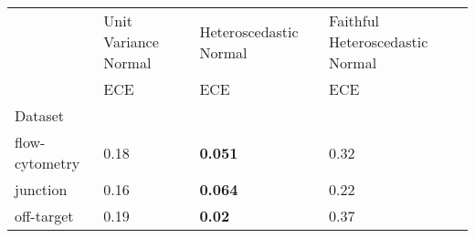 \begin{tabular}{l|l|l|l}
\toprule
 & Unit Variance Normal & Heteroscedastic Normal & Faithful Heteroscedastic Normal \\
 & ECE & ECE & ECE \\
Dataset &  &  &  \\
\midrule
flow-cytometry & 0.18 & \bfseries 0.051 & 0.32 \\
junction & 0.16 & \bfseries 0.064 & 0.22 \\
off-target & 0.19 & \bfseries 0.02 & 0.37 \\
\bottomrule
\end{tabular}
